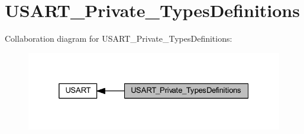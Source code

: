 \hypertarget{group___u_s_a_r_t___private___types_definitions}{}\section{U\+S\+A\+R\+T\+\_\+\+Private\+\_\+\+Types\+Definitions}
\label{group___u_s_a_r_t___private___types_definitions}
Collaboration diagram for U\+S\+A\+R\+T\+\_\+\+Private\+\_\+\+Types\+Definitions\+:
\nopagebreak
\begin{figure}[H]
\begin{center}
\leavevmode
\includegraphics[width=325pt]{group___u_s_a_r_t___private___types_definitions}
\end{center}
\end{figure}
